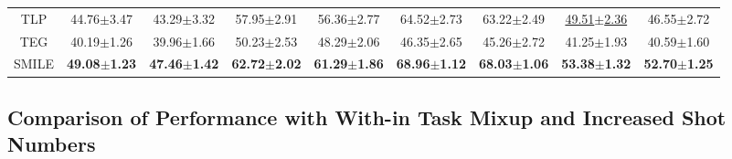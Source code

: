 \begin{table*}[ht]
{\begin{tabular}{@{}c|cccccccc@{}}
TLP                    & 44.76$\pm$3.47                        & 43.29$\pm$3.32                       & 57.95$\pm$2.91                        & 56.36$\pm$2.77                       & 64.52$\pm$2.73                       & 63.22$\pm$2.49                       & \underline{49.51$\pm$2.36}                       & 46.55$\pm$2.72                       \\
TEG                    & 40.19$\pm$1.26                        & 39.96$\pm$1.66                       & 50.23$\pm$2.53                        & 48.29$\pm$2.06                       & 46.35$\pm$2.65                       & 45.26$\pm$2.72                       & 41.25$\pm$1.93                       & 40.59$\pm$1.60                       \\ \midrule
SMILE                    & \textbf{49.08$\pm$1.23}               & \textbf{47.46$\pm$1.42}              & \textbf{62.72$\pm$2.02}               & \textbf{61.29$\pm$1.86}              & \textbf{68.96$\pm$1.12}              & \textbf{68.03$\pm$1.06}              & \textbf{53.38$\pm$1.32}              & \textbf{52.70$\pm$1.25}              \\ \bottomrule
\end{tabular} %
}
\end{table*}

\subsection{Comparison of Performance with With-in Task Mixup and Increased Shot Numbers}

